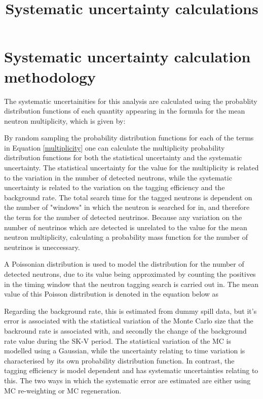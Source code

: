 \documentclass{article}
\begin{document}
\title{Systematic uncertainty calculations}


\section{Systematic uncertainty calculation methodology}


The systematic uncertainities for this analysis are calculated using the probablity distribution functions of each quantity appearing in the formula for the mean neutron multiplicity, which is given by:




By random sampling the probability distribution functions for each of the terms in Equation \eqref{multiplicity} one can calculate the multiplicity probability distribution functions for both the statistical uncertainty and the systematic uncertainty. The statistical uncertainty for the value for the multiplicity is related to the variation in the number of detected neutrons, while the systematic uncertainty is related to the variation on the tagging efficiency and the background rate. The total search time for the tagged neutrons is dependent on the number of "windows" in which the neutron is searched for in, and therefore the term for the number of detected neutrinos. Because any variation on the number of neutrinos which are detected is unrelated to the value for the mean neutron multiplicity, calculating a probability mass function for the number of neutrinos is uneccessary. 

A Poissonian distribution is used to model the distribution for the number of detected neutrons, due to its value being approximated by counting the positives in the timing window that the neutron tagging search is carried out in. The mean value of this Poisson distribution is denoted in the equation below as 


Regarding the background rate, this is estimated from dummy spill data, but it's error is associated with the statistical variation of the Monte Carlo size that the backround rate is associated with, and secondly the change of the background rate value during the SK-V period. The statistical variation of the MC is modelled using a Gaussian, while the uncertainty relating to time variation is characterised by its own probability distribution function. In contrast, the tagging efficiency is model dependent and has systematic uncertainties relating to this. The two ways in which the systematic error are estimated are either using MC re-weighting or MC regeneration.
\end{document}
